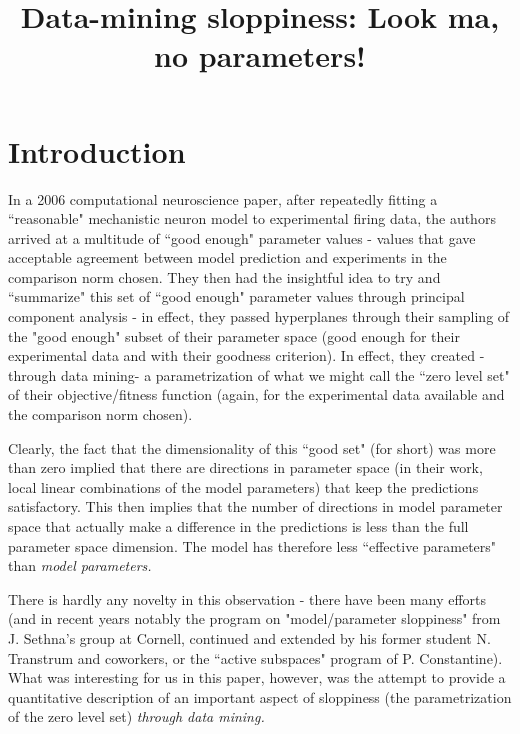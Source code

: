 \documentclass{article}
\title{Data-mining sloppiness: Look ma, no parameters!}
\author{}
\begin{document}
\maketitle

\section{Introduction}

In a 2006 computational neuroscience paper, after repeatedly fitting a ``reasonable" mechanistic neuron model to experimental firing data, the authors arrived at a multitude of ``good enough" parameter values - values that gave acceptable agreement between model prediction and experiments in the comparison norm chosen. They then had the insightful idea to try and ``summarize" this set of ``good enough" parameter values through principal component analysis - in effect, they passed hyperplanes through their sampling of the "good enough" subset of their parameter space (good enough
for their experimental data and with their goodness criterion).
%
In effect, they created -through data mining- a parametrization of what we might call the ``zero level set" of their objective/fitness function (again, for the experimental data available and the comparison norm chosen).

Clearly, the fact that the dimensionality of this ``good set" (for short) was more than zero implied that there are
directions in parameter space (in their work, local linear combinations of the model parameters) that keep the
predictions satisfactory.
%
This then implies that the number of directions in model parameter space that actually make a difference in the predictions is less than the full parameter space dimension.
%
The model has therefore less ``effective parameters" than \em{model parameters}.

There is hardly any novelty in this observation - there have been many efforts (and in recent years notably the program on "model/parameter sloppiness" from J. Sethna's group at Cornell, continued and extended by his former student
N. Transtrum and coworkers, or the ``active subspaces" program of P. Constantine).
%
What was interesting for us in this paper, however, was the attempt to provide a quantitative description of an important aspect of sloppiness (the parametrization of the zero level set) \em{through data mining}.
\end{document}
